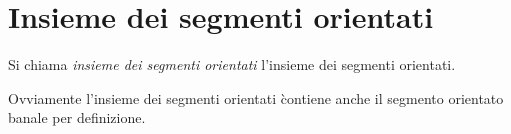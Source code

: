 \section{Insieme dei segmenti orientati}
\begin{definizione}
Si chiama \textit{insieme dei segmenti orientati} l'insieme dei segmenti orientati.
\end{definizione}

\begin{osservazione}
 Ovviamente l'insieme dei segmenti orientati \`contiene anche il segmento orientato banale per definizione.
\end{osservazione}


